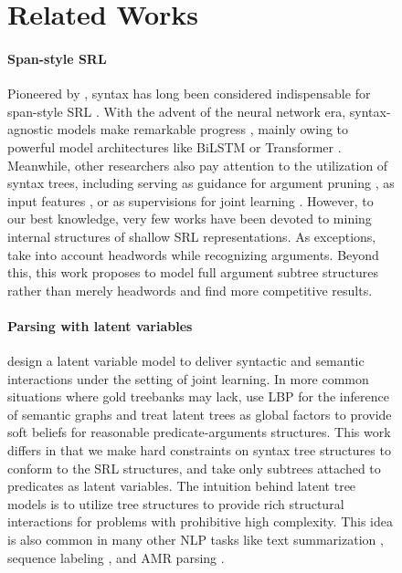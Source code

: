 \documentclass[11pt]{article}
\begin{document}
\begin{figure}[tb!]
\section{Related Works}\label{sec:relworks}

\paragraph{Span-style SRL}
Pioneered by \citet{gildea-jurafsky-2002-automatic}, syntax has long been considered indispensable for span-style SRL \cite{punyakanok-etal-2008-importance}.
With the advent of the neural network era, syntax-agnostic models make remarkable progress \cite{zhou-xu-2015-end,tan-etal-2018-deep,cai-etal-2018-full}, mainly owing to powerful model architectures like BiLSTM \cite{yarin-etal-2016-dropout} or Transformer \cite{vaswani-2017-attention}.
Meanwhile, other researchers also pay attention to the utilization of syntax trees, including serving as guidance for argument pruning \cite{he-etal-2018-syntax}, as input features \cite{marcheggiani-titov-2017-encoding,xia-etal-2019-syntax,mohammadshahi-etal-2021-g2g}, or as supervisions for joint learning \cite{swayamdipta-etal-2018-syntactic}.
However, to our best knowledge, very few works have been devoted to mining internal structures of shallow SRL representations.
As exceptions, \citet{he-etal-2018-jointly,zhang-etal-2021-comparing} take into account headwords while recognizing arguments.
Beyond this, this work proposes to model full argument subtree structures rather than merely headwords and find more competitive results.








\paragraph{Parsing with latent variables}
\citet{henderson-etal-2008-latent, henderson-etal-2013-multilingual} design a latent variable model to deliver syntactic and semantic interactions under the setting of joint learning.
In more common situations where gold treebanks may lack, \citet{naradowsky-etal-2012-improving,gormley-etal-2014-low} use LBP for the inference of semantic graphs and treat latent trees as global factors \cite{smith-eisner-2008-dependency} to provide soft beliefs for reasonable predicate-arguments structures.
This work differs in that we make hard constraints on syntax tree structures to conform to the SRL structures, and take only subtrees attached to predicates as latent variables.
The intuition behind latent tree models \cite{marina-michael-2000-mixure,chu-etal-2017-latent,kim-2017-structured} is to utilize tree structures to provide rich structural interactions for problems with prohibitive high complexity.
This idea is also common in many other NLP tasks like text summarization \cite{liu-lapata-2018-learning}, sequence labeling \cite{zhou-etal-2020-latent}, and AMR parsing \cite{zhou-etal-2020-amr}.


\end{figure}
\end{document}
